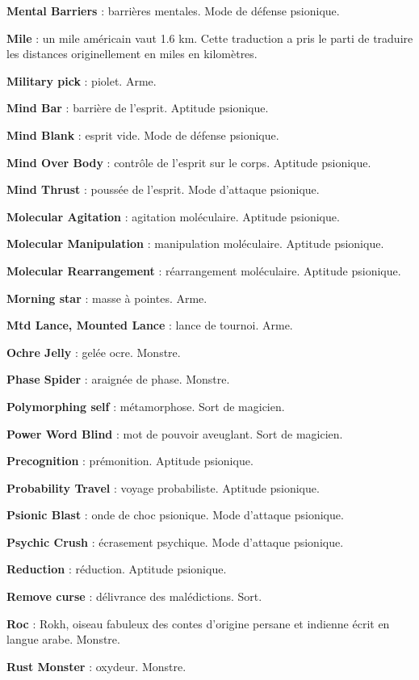 \documentclass[11pt]{article}
\begin{document}
{\textbf{Mental Barriers} : barrières mentales. Mode de défense psionique.

\textbf{Mile} : un mile américain vaut 1.6 km. Cette traduction a pris le parti de traduire les distances originellement en miles en kilomètres.

\textbf{Military pick} : piolet. Arme.

\textbf{Mind Bar} : barrière de l'esprit. Aptitude psionique.

\textbf{Mind Blank} : esprit vide. Mode de défense psionique.

\textbf{Mind Over Body} : contrôle de l'esprit sur le corps. Aptitude psionique.

\textbf{Mind Thrust} : poussée de l'esprit. Mode d'attaque psionique.

\textbf{Molecular Agitation} : agitation moléculaire. Aptitude psionique.

\textbf{Molecular Manipulation} : manipulation moléculaire. Aptitude psionique.

\textbf{Molecular Rearrangement} : réarrangement moléculaire. Aptitude psionique.

\textbf{Morning star} : masse à pointes. Arme.

\textbf{Mtd Lance, Mounted Lance} : lance de tournoi. Arme.

\textbf{Ochre Jelly} : gelée ocre. Monstre.

\textbf{Phase Spider} : araignée de phase. Monstre.

\textbf{Polymorphing self} : métamorphose. Sort de magicien.

\textbf{Power Word Blind} : mot de pouvoir aveuglant. Sort de magicien.

\textbf{Precognition} : prémonition. Aptitude psionique.

\textbf{Probability Travel} : voyage probabiliste. Aptitude psionique.

\textbf{Psionic Blast} : onde de choc psionique. Mode d'attaque psionique.

\textbf{Psychic Crush} : écrasement psychique. Mode d'attaque psionique.

\textbf{Reduction} : réduction. Aptitude psionique.

\textbf{Remove curse} : délivrance des malédictions. Sort.

\textbf{Roc} : Rokh, oiseau fabuleux des contes d'origine persane et indienne écrit en langue arabe. Monstre.

\textbf{Rust Monster} : oxydeur. Monstre.

}
\end{document}
